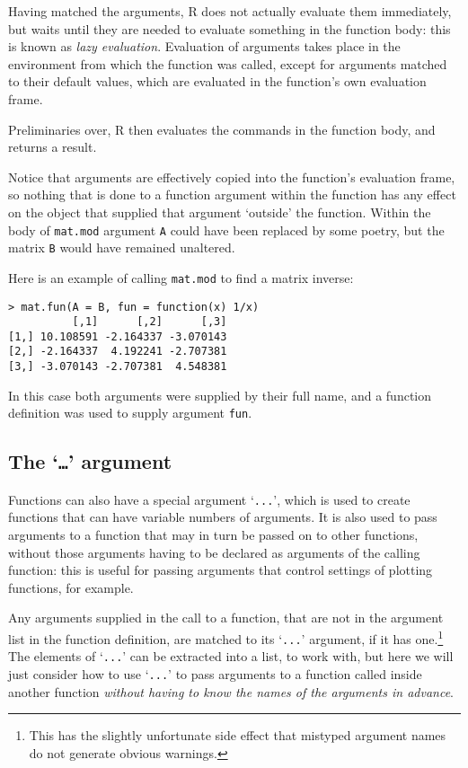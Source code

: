 \documentclass[10pt] {article}
\theoremstyle{definition}
\begin{document}
Having matched the arguments, R does not actually evaluate them immediately, but waits until they are needed to evaluate something in the function body: this is known as {\em lazy evaluation}. Evaluation of arguments takes place in the environment from which the function was called, except for arguments matched to their default values, which are evaluated in the function's own evaluation frame. 

Preliminaries over, R then evaluates the commands in the function body, and returns a result. 

Notice that arguments are effectively copied into the function's evaluation frame, so nothing that is done to a function argument within the function has any effect on the object that supplied that argument `outside' the function. Within the body of {\lstinline+mat.mod+} argument {\lstinline+A+} could have been replaced by some poetry, but the matrix {\lstinline+B+} would have remained unaltered.

Here is an example of calling {\lstinline+mat.mod+} to find a matrix inverse:
\begin{lstlisting}
> mat.fun(A = B, fun = function(x) 1/x)
          [,1]      [,2]      [,3]
[1,] 10.108591 -2.164337 -3.070143
[2,] -2.164337  4.192241 -2.707381
[3,] -3.070143 -2.707381  4.548381
\end{lstlisting}
In this case both arguments were supplied by their full name, and a function definition was used to supply argument {\lstinline+fun+}. 

\subsection{The `{\tt \ldots}' argument \label{sec:dots}}

Functions can also have a special argument `\lstinline$...$', which is used to create functions that can have variable numbers of arguments. It is also used to pass arguments to a function that may in turn be passed on to other functions, without those arguments having to be declared as arguments of the calling function: this is useful for passing arguments that control settings of plotting functions, for example. 

Any arguments supplied in the call to a function, that are not in the argument list in the function definition, are matched to its `\lstinline$...$' argument, if it has one.\footnote{This has the slightly unfortunate side effect that mistyped argument names do not generate obvious warnings.} The elements of `\lstinline$...$' can be extracted into a list, to work with, but here we will just consider how to use `\lstinline$...$' to pass arguments to a function called inside another function {\em without having to know the names of the arguments in advance}. 
\end{document}
